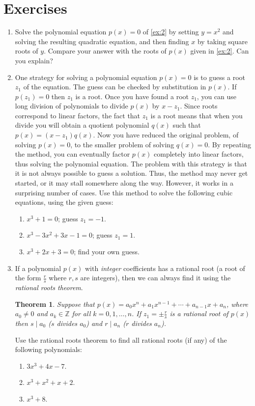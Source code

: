 \documentclass[11pt]{article}
\newenvironment{problems}
{
 \begin{enumerate}[topsep=1pt,itemsep=0pt,parsep=2pt,leftmargin=0.6cm,%
 label={\arabic*.}, ref=\arabic*] \small
}
{
 \end{enumerate}
}
\newtheorem*{thm*}{Theorem}
\theoremstyle{definition}
\newcommand{\Z}{\mathbb{Z}} %
\begin{document}
\section*{Exercises}

\begin{problems}

\item Solve the polynomial equation $p(x)=0$ of \ref{ex:2} by setting
  $y=x^2$ and solving the resulting quadratic equation, and then
  finding $x$ by taking square roots of $y$.  Compare your answer with
  the roots of $p(x)$ given in \ref{ex:2}. Can you explain?

\item One strategy for solving a polynomial equation $p(x)=0$ is to
  guess a root $z_1$ of the equation. The guess can be checked by
  substitution in $p(x)$. If $p(z_1)=0$ then $z_1$ is a root. Once you
  have found a root $z_1$, you can use long division of polynomials to
  divide $p(x)$ by $x-z_1$. Since roots correspond to linear factors,
  the fact that $z_1$ is a root means that when you divide you will
  obtain a quotient polynomial $q(x)$ such that $p(x) = (x-z_1) q(x)$.
  Now you have reduced the original problem, of solving $p(x)=0$, to
  the smaller problem of solving $q(x)=0$. By repeating the method,
  you can eventually factor $p(x)$ completely into linear factors,
  thus solving the polynomial equation.  The problem with this
  strategy is that it is not always possible to guess a
  solution. Thus, the method may never get started, or it may stall
  somewhere along the way. However, it works in a surprising number of
  cases. Use this method to solve the following cubic equations, using
  the given guess:
  \begin{enumerate}
  \item $x^3+1 = 0$; guess $z_1 = -1$.
  \item $x^3-3x^2+3x-1 = 0$; guess $z_1 = 1$.
  \item $x^3+2x+3 = 0$; find your own guess.
  \end{enumerate}

\item If a polynomial $p(x)$ with \emph{integer} coefficients has a
  rational root (a root of the form $\frac{r}{s}$ where $r,s$ are
  integers), then we can always find it using the \emph{rational roots
  theorem}.
  \begin{thm*}
    Suppose that
    $p(x) = a_0 x^n + a_1 x^{n-1} + \cdots + a_{n-1} x + a_n$, where
    $a_0 \ne 0$ and $a_k \in \Z$ for all $k = 0, 1, \dots, n$. If
    $z_1 = \pm \frac{r}{s}$ is a rational root of $p(x)$ then
    $s \mid a_0$ ($s$ divides $a_0$) and $r \mid a_n$ ($r$ divides
    $a_n$).
  \end{thm*}
  Use the rational roots theorem to find all rational roots (if any)
  of the following polynomials:
  \begin{enumerate}
  \item $3x^3+4x-7$.
  \item $x^3+x^2+x+2$.
  \item $x^3+8$.
  \end{enumerate}


\end{problems}
\end{document}
